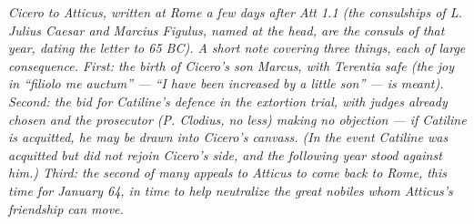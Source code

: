
\textit{Cicero to Atticus, written at Rome a few days
after Att 1.1 (the consulships of L. Julius Caesar and
Marcius Figulus, named at the head, are the consuls of
that year, dating the letter to 65 BC). A short note
covering three things, each of large consequence. First:
the birth of Cicero's son Marcus, with Terentia safe (the
joy in ``filiolo me auctum'' --- ``I have been increased
by a little son'' --- is meant). Second: the bid for
Catiline's defence in the extortion trial, with judges
already chosen and the prosecutor (P. Clodius, no less)
making no objection --- if Catiline is acquitted, he may
be drawn into Cicero's canvass. (In the event Catiline
was acquitted but did not rejoin Cicero's side, and the
following year stood against him.) Third: the second of
many appeals to Atticus to come back to Rome, this time
for January 64, in time to help neutralize the great
nobiles whom Atticus's friendship can move.}
